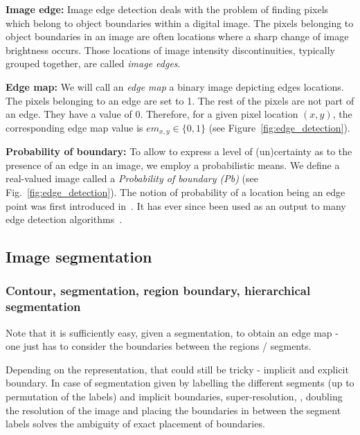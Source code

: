 \textbf{Image edge:} Image edge detection deals with the problem of finding pixels which belong to object boundaries within a digital image. The pixels belonging to object boundaries in an image are often locations where a sharp change of image brightness occurs. Those locations of image intensity discontinuities, typically grouped together, are called \textit{image edges}.

\textbf{Edge map:} We will call an \textit{edge map} a binary image depicting edges locations. The pixels belonging to an edge are set to 1. The rest of the pixels are not part of an edge. They have a value of 0. Therefore, for a given pixel location $(x,y)$, the corresponding edge map value is $em_{x,y} \in \{0,1\}$ (see Figure~\ref{fig:edge_detection}).

\textbf{Probability of boundary:} To allow to express a level of (un)certainty as to the presence of an edge in an image, we employ a probabilistic means. We define a real-valued image called a \textit{Probability of boundary (Pb)} (see Fig.~\ref{fig:edge_detection}). 
The notion of probability of a location being an edge point was first introduced in~\cite{martin2004learning}. %
It has ever since been used as an output to many edge detection algorithms~\cite{Maire2008using,LimZD13,DollarICCV13edges,Isola2014crisp,Ganin2014n4fields,Hallman2014}.

\subsection{Image segmentation}

\subsubsection*{Contour, segmentation, region boundary, hierarchical segmentation}

Note that it is sufficiently easy, given a segmentation, to obtain an edge map - one just has to consider the boundaries between the regions / segments. %

Depending on the representation, that could still be tricky - implicit and explicit boundary. In case of segmentation given by labelling the different segments (up to permutation of the labels) and implicit boundaries, super-resolution, \ie, doubling the resolution of the image and placing the boundaries in between the segment labels solves the ambiguity of exact placement of boundaries.

